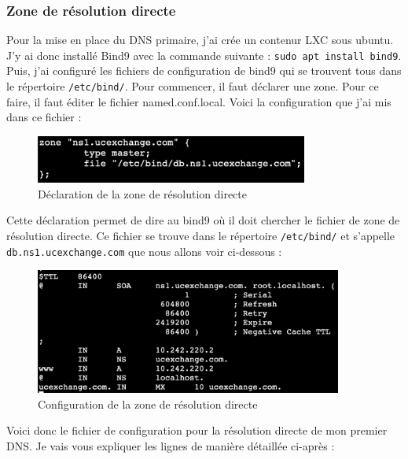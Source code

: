 \documentclass[12pt, a4paper]{article}
\begin{document}
    \subsubsection{Zone de résolution directe}
    Pour la mise en place du DNS primaire, j'ai crée un contenur LXC sous
    ubuntu. J'y ai donc installé Bind9 avec la commande suivante : 
    \texttt{sudo apt install bind9}. Puis, j'ai configuré les fichiers
    de configuration de bind9 qui se trouvent tous dans le répertoire 
    \texttt{/etc/bind/}. Pour commencer, il faut déclarer une zone. 
    Pour ce faire, il faut éditer le fichier named.conf.local. Voici la
    configuration que j'ai mis dans ce fichier :

    \begin{figure}[h]
		\centering
		\includegraphics[width=0.8\textwidth]{img/zone1.png}
		\caption{Déclaration de la zone de résolution directe}
		\label{fig:zone1}
	\end{figure}
    
    Cette déclaration permet de dire au bind9 où il doit chercher le
    fichier de zone de résolution directe. Ce fichier se trouve dans le
    répertoire \texttt{/etc/bind/} et s'appelle \texttt{db.ns1.ucexchange.com}
    que nous allons voir ci-dessous : 
    \newpage

    \begin{figure}[h]
		\centering
		\includegraphics[width=0.9\textwidth]{img/zone1-db.png}
		\caption{Configuration de la zone de résolution directe}
		\label{fig:zone1-db}
	\end{figure}
    Voici donc le fichier de configuration pour la résolution directe de mon 
    premier DNS. Je vais vous expliquer les lignes de manière détaillée ci-après :\\
\end{document}
